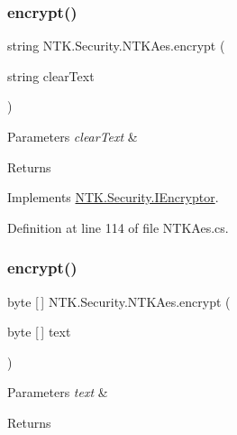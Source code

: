 \subsubsection{\texorpdfstring{encrypt()}{encrypt()}\hspace{0.1cm}{\footnotesize\ttfamily [1/2]}}
{\footnotesize\ttfamily string N\+T\+K.\+Security.\+N\+T\+K\+Aes.\+encrypt (\begin{DoxyParamCaption}\item[{string}]{clear\+Text }\end{DoxyParamCaption})}






\begin{DoxyParams}{Parameters}
{\em clear\+Text} & \\
\hline
\end{DoxyParams}
\begin{DoxyReturn}{Returns}

\end{DoxyReturn}


Implements \mbox{\hyperlink{interface_n_t_k_1_1_security_1_1_i_encryptor_a5ed0f74ca96c48c6b36c209e5847d3d1}{N\+T\+K.\+Security.\+I\+Encryptor}}.



Definition at line 114 of file N\+T\+K\+Aes.\+cs.

\mbox{\label{class_n_t_k_1_1_security_1_1_n_t_k_aes_ad9da3eba89f2724ebe54e63086cee810}} 
\subsubsection{\texorpdfstring{encrypt()}{encrypt()}\hspace{0.1cm}{\footnotesize\ttfamily [2/2]}}
{\footnotesize\ttfamily byte \mbox{[}$\,$\mbox{]} N\+T\+K.\+Security.\+N\+T\+K\+Aes.\+encrypt (\begin{DoxyParamCaption}\item[{byte \mbox{[}$\,$\mbox{]}}]{text }\end{DoxyParamCaption})}






\begin{DoxyParams}{Parameters}
{\em text} & \\
\hline
\end{DoxyParams}
\begin{DoxyReturn}{Returns}

\end{DoxyReturn}


